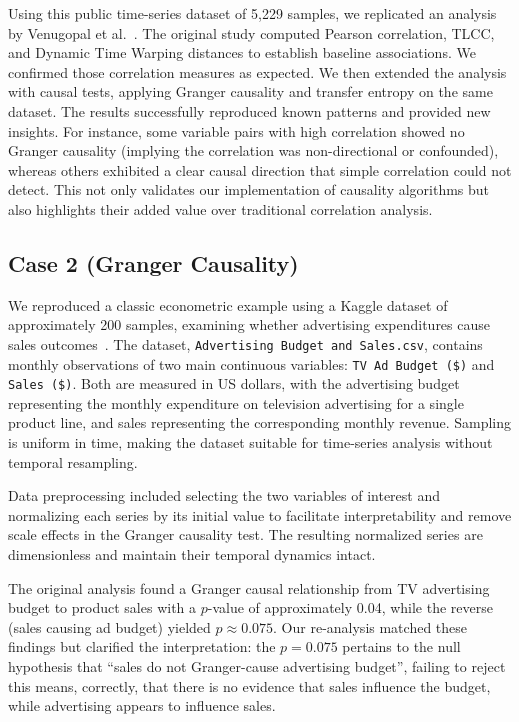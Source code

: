 Using this public time-series dataset of 5,229 samples, we replicated an analysis by Venugopal et al.~\cite{Venugopal2023}. The original study computed Pearson correlation, TLCC, and Dynamic Time Warping distances to establish baseline associations. We confirmed those correlation measures as expected. We then extended the analysis with causal tests, applying Granger causality and transfer entropy on the same dataset. The results successfully reproduced known patterns and provided new insights. For instance, some variable pairs with high correlation showed no Granger causality (implying the correlation was non-directional or confounded), whereas others exhibited a clear causal direction that simple correlation could not detect. This not only validates our implementation of causality algorithms but also highlights their added value over traditional correlation analysis.

\subsection{Case 2 (Granger Causality)}
We reproduced a classic econometric example using a Kaggle dataset of approximately 200 samples, examining whether advertising expenditures cause sales outcomes~\cite{Regi2023}. The dataset, \texttt{Advertising Budget and Sales.csv}, contains monthly observations of two main continuous variables: \texttt{TV Ad Budget (\$)} and \texttt{Sales (\$)}. Both are measured in US dollars, with the advertising budget representing the monthly expenditure on television advertising for a single product line, and sales representing the corresponding monthly revenue. Sampling is uniform in time, making the dataset suitable for time-series analysis without temporal resampling.

Data preprocessing included selecting the two variables of interest and normalizing each series by its initial value to facilitate interpretability and remove scale effects in the Granger causality test. The resulting normalized series are dimensionless and maintain their temporal dynamics intact.

The original analysis found a Granger causal relationship from TV advertising budget to product sales with a $p$-value of approximately 0.04, while the reverse (sales causing ad budget) yielded $p \approx 0.075$. Our re-analysis matched these findings but clarified the interpretation: the $p = 0.075$ pertains to the null hypothesis that ``sales do not Granger-cause advertising budget'', failing to reject this means, correctly, that there is no evidence that sales influence the budget, while advertising appears to influence sales.

